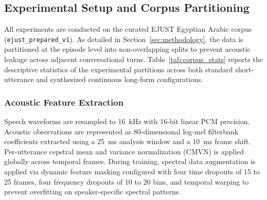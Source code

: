 \documentclass[journal]{IEEEtran}
\begin{document}
\subsection{Experimental Setup and Corpus Partitioning}
\label{sec:exp_setup}
All experiments are conducted on the curated EJUST Egyptian Arabic corpus (\texttt{ejust\_prepared\_v1}). As detailed in Section~\ref{sec:methodology}, the data is partitioned at the episode level into non-overlapping splits to prevent acoustic leakage across adjacent conversational turns. Table~\ref{tab:corpus_stats} reports the descriptive statistics of the experimental partitions across both standard short-utterance and synthesized continuous long-form configurations.

\begin{table}[!t]
\centering
\caption{Corpus Partitioning Statistics of the Curated EJUST Egyptian Arabic Dataset (\texttt{ejust\_prepared\_v1}).}
\label{tab:corpus_stats}
\end{table}

\subsubsection{Acoustic Feature Extraction}
Speech waveforms are resampled to 16~kHz with 16-bit linear PCM precision. Acoustic observations are represented as 80-dimensional log-mel filterbank coefficients extracted using a 25~ms analysis window and a 10~ms frame shift. Per-utterance cepstral mean and variance normalization (CMVN) is applied globally across temporal frames. During training, spectral data augmentation is applied via dynamic feature masking configured with four time dropouts of 15 to 25 frames, four frequency dropouts of 10 to 20 bins, and temporal warping to prevent overfitting on speaker-specific spectral patterns.
\end{document}
